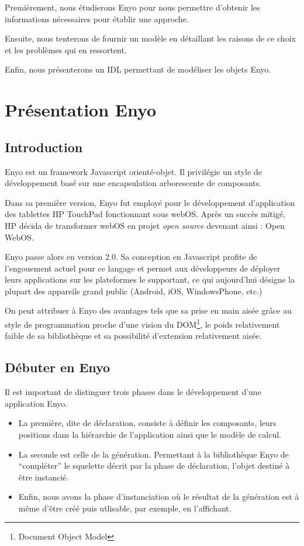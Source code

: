 \documentclass[11pt,a4paper]{report}
\begin{document}
Premièrement, nous étudierons Enyo pour nous permettre d'obtenir les informations nécessaires 
pour établir une approche.

Ensuite, nous tenterons de fournir un modèle en détaillant les raisons de ce choix et les problèmes
qui en ressortent.

Enfin, nous présenterons un IDL permettant de modéliser les objets Enyo.

\chapter{Présentation Enyo}\label{chap:enyo}
\section{Introduction}
Enyo\cite{enyo} est un framework Javascript orienté-objet. Il privilégie un style de développement basé
sur une encapsulation arborescente de composants.\medskip

Dans sa première version, Enyo fut employé pour le développement d'application des 
tablettes HP TouchPad fonctionnant sous webOS. Après un succès mitigé,
HP décida de transformer webOS en projet \emph{open source} devenant ainsi : Open WebOS.\medskip

Enyo passe alors en version 2.0. Sa conception en Javascript profite de  
l'engouement actuel pour ce langage et permet aux développeurs de déployer leurs 
applications sur les plateformes le supportant, ce qui aujourd'hui désigne 
la plupart des appareils grand public (Android, iOS, WindowsPhone, etc.)\medskip

On peut attribuer à Enyo des avantages tels que sa prise en main aisée grâce au style 
de programmation proche d'une vision du DOM\footnote{Document Object Model}, le poids relativement 
faible de sa bibliothèque et sa possibilité d'extension relativement aisée.

\clearpage

\section{Débuter en Enyo}

Il est important de distinguer trois phases dans le développement d'une application 
Enyo.
\begin{itemize}
\item La première, dite de déclaration, consiste à définir les composants, leurs positions dans 
la hiérarchie de l'application ainsi que le modèle de calcul.
\item La seconde est celle de la génération. Permettant à la bibliothèque Enyo de 
``compléter'' le squelette décrit par la phase de déclaration, l'objet destiné
à être instancié.
\item Enfin, nous avons la phase d'instanciation où le résultat de la génération
est à même d'être créé puis utlisable, par exemple, en l'affichant.
\end{itemize}\medskip
\end{document}
